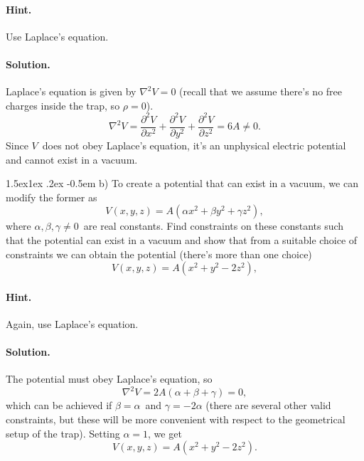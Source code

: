 \documentclass[%
oneside,                 %
final,                   %
10pt]{article}
\makeatletter
\newenvironment{doconceexercise}{}{}
\newcommand\subex{\@startsection{paragraph}{4}{\z@}%
                  {1.5ex\@plus1ex \@minus.2ex}%
                  {-0.5em}%
                  {\normalfont\normalsize\bfseries}}
\makeatother
\begin{document}
\begin{doconceexercise}
\paragraph{Hint.}
Use Laplace's equation.



\paragraph{Solution.}
Laplace's equation is given by $\nabla^2 V = 0$ (recall that we assume there's no free charges inside the trap, so $\rho = 0$).
\begin{equation}
  \nabla^2 V = \frac{\partial^2 V}{\partial x^2} + \frac{\partial^2 V}{\partial y^2} + \frac{\partial^2 V}{\partial z^2} = 6A \neq 0.
\end{equation}
Since $V$ does not obey Laplace's equation, it's an unphysical electric potential and cannot exist in a vacuum.


\subex{b)}
To create a potential that can exist in a vacuum, we can modify the former as
\begin{equation}
  V(x,y,z) = A(\alpha x^2 + \beta y^2 + \gamma z^2),
\end{equation}
where $\alpha, \beta, \gamma \neq 0$ are real constants. Find constraints on these constants such that the potential can exist in a vacuum and show that from a suitable choice of constraints we can obtain the potential (there's more than one choice)
\begin{equation}
  V(x,y,z) = A( x^2 +  y^2 - 2z^2),
\end{equation}


\paragraph{Hint.}
Again, use Laplace's equation.



\paragraph{Solution.}
The potential must obey Laplace's equation, so
\begin{equation}
  \nabla^2 V =2A(\alpha  + \beta  + \gamma ) = 0,
\end{equation}
which can be achieved if $\beta = \alpha$ and $\gamma = -2\alpha$ (there are several other valid constraints, but these will be more convenient with respect to the geometrical setup of the trap). Setting $\alpha = 1$, we get
\begin{equation}
  V(x,y,z) = A(x^2 + y^2 - 2z^2).
\end{equation}


\end{doconceexercise}
\end{document}
